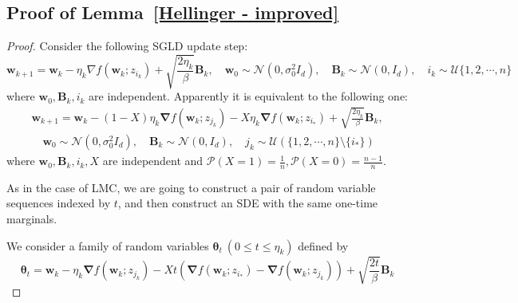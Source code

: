\documentclass[final,12pt]{colt2018} %
\begin{document}
\subsection{Proof of Lemma~\ref{Hellinger - improved}}
\begin{proof}
  Consider the following SGLD update step:
\begin{equation}
  \bm{w}_{k+1}=\bm{w}_k-\eta_k\nabla f(\bm{w}_k;z_{i_k})+\sqrt{\frac{2\eta_k}{\beta}}\bm{B}_k,\quad \bm{w}_0\sim \mathcal{N}(0,\sigma_0^2I_d),\quad \bm{B}_k\sim \mathcal{N}(0,I_d),\quad i_k\sim\mathcal{U}\{1,2,\cdots,n\}
 \end{equation}
 where $\bm{w}_0,\bm{B}_k,i_k$ are independent. Apparently it is equivalent to the following one:
\begin{align*}
\bm{w}_{k+1}=\bm{w}_k-(1-X)\eta_k\bm{\nabla} f(\bm{w}_k;z_{j_k})-X \eta_k \bm{\nabla}f(\bm{w}_k;z_{i_*})+\sqrt{\frac{2\eta_k}{\beta}}\bm{B}_k,\\\quad \bm{w}_0\sim \mathcal{N}(0,\sigma_0^2I_d),\quad \bm{B}_k\sim \mathcal{N}(0,I_d), \quad j_k\sim\mathcal{U}(\{1,2,\cdots,n\}\setminus \{i_*\})
\end{align*}
where $\bm{w}_0,\bm{B}_k,i_k,X$ are independent and $\mathcal{P}(X=1)=\frac{1}{n}, \mathcal{P}(X=0)=\frac{n-1}{n}$.

As in the case of LMC, we are going to construct a pair of random variable sequences indexed by $t$, and then construct an SDE with the same one-time marginals.

We consider a family of random variables $\bm{\theta}_t~(0\le t\le \eta_k)$ defined by
\begin{equation}
  \bm{\theta}_t=\bm{w}_k-\eta_k\bm{\nabla} f(\bm{w}_k;z_{j_k})-X t (\bm{\nabla}f(\bm{w}_k;z_{i_*})-\bm{\nabla} f(\bm{w}_k;z_{j_k}))+\sqrt{\frac{2t}{\beta}}\bm{B}_k
\end{equation}


\end{proof}
\end{document}
